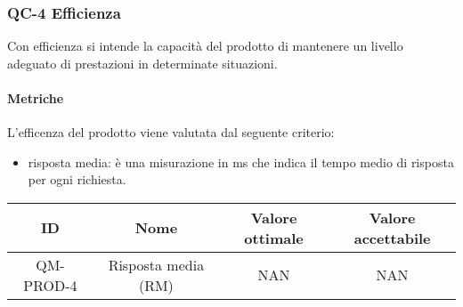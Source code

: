 \subsubsection{QC-4 Efficienza}
Con efficienza si intende la capacità del prodotto di mantenere un livello adeguato di prestazioni in determinate situazioni.
	
	\paragraph{Metriche}
	L'efficenza del prodotto viene valutata dal seguente criterio:
	\begin{itemize}
		\item risposta media: è una misurazione in ms che indica il tempo medio di risposta per ogni richiesta.
	\end{itemize}
	\begin{center}
		\begin{tabular}{|c|c|c|c|}
			\rowcolor{lighter-grayer}
			\hline
			ID & Nome & Valore ottimale & Valore accettabile \\
			\hline
			QM-PROD-4 & Risposta media (RM) & NAN & NAN \\
			\hline
		\end{tabular}
	\end{center}
